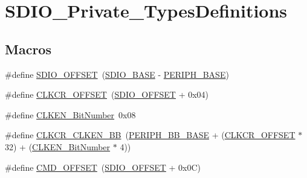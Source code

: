 \hypertarget{group___s_d_i_o___private___types_definitions}{}\section{S\+D\+I\+O\+\_\+\+Private\+\_\+\+Types\+Definitions}
\label{group___s_d_i_o___private___types_definitions}
\subsection*{Macros}
\begin{DoxyCompactItemize}
\item 
\#define \hyperlink{group___s_d_i_o___private___types_definitions_gabf07aced03df5f46d57cea1d4f56d1e3}{S\+D\+I\+O\+\_\+\+O\+F\+F\+S\+ET}~(\hyperlink{openmotestm_2library_2inc_2stm32f10x__map_8h_a95dd0abbc6767893b4b02935fa846f52}{S\+D\+I\+O\+\_\+\+B\+A\+SE} -\/ \hyperlink{openmotestm_2library_2inc_2stm32f10x__map_8h_a9171f49478fa86d932f89e78e73b88b0}{P\+E\+R\+I\+P\+H\+\_\+\+B\+A\+SE})
\item 
\#define \hyperlink{group___s_d_i_o___private___types_definitions_gac5d642be874338519fdec175204ca8ed}{C\+L\+K\+C\+R\+\_\+\+O\+F\+F\+S\+ET}~(\hyperlink{openmotestm_2library_2src_2stm32f10x__sdio_8c_abf07aced03df5f46d57cea1d4f56d1e3}{S\+D\+I\+O\+\_\+\+O\+F\+F\+S\+ET} + 0x04)
\item 
\#define \hyperlink{group___s_d_i_o___private___types_definitions_ga6ad1da47f9d84c54eb620b9231ebec86}{C\+L\+K\+E\+N\+\_\+\+Bit\+Number}~0x08
\item 
\#define \hyperlink{group___s_d_i_o___private___types_definitions_gabfb5772b9b734972b576309f7ca8bf92}{C\+L\+K\+C\+R\+\_\+\+C\+L\+K\+E\+N\+\_\+\+BB}~(\hyperlink{openmotestm_2library_2inc_2stm32f10x__map_8h_aed7efc100877000845c236ccdc9e144a}{P\+E\+R\+I\+P\+H\+\_\+\+B\+B\+\_\+\+B\+A\+SE} + (\hyperlink{openmotestm_2library_2src_2stm32f10x__sdio_8c_ac5d642be874338519fdec175204ca8ed}{C\+L\+K\+C\+R\+\_\+\+O\+F\+F\+S\+ET} $\ast$ 32) + (\hyperlink{openmotestm_2library_2src_2stm32f10x__sdio_8c_a6ad1da47f9d84c54eb620b9231ebec86}{C\+L\+K\+E\+N\+\_\+\+Bit\+Number} $\ast$ 4))
\item 
\#define \hyperlink{group___s_d_i_o___private___types_definitions_gaf12d26702ce7a88d2a3dae87f000b75e}{C\+M\+D\+\_\+\+O\+F\+F\+S\+ET}~(\hyperlink{openmotestm_2library_2src_2stm32f10x__sdio_8c_abf07aced03df5f46d57cea1d4f56d1e3}{S\+D\+I\+O\+\_\+\+O\+F\+F\+S\+ET} + 0x0\+C)
\item 

\end{DoxyCompactItemize}
